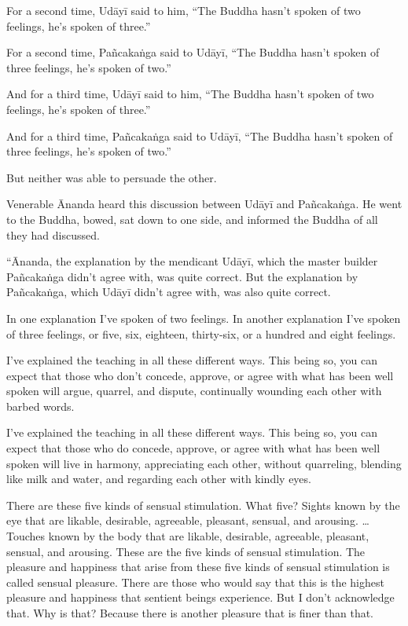 \documentclass[12pt,openany]{book}%
\begin{document}
For a second time, \textsanskrit{Udāyī} said to him, “The Buddha hasn’t spoken of two feelings, he’s spoken of three.” 

For a second time, \textsanskrit{Pañcakaṅga} said to \textsanskrit{Udāyī}, “The Buddha hasn’t spoken of three feelings, he’s spoken of two.” 

And for a third time, \textsanskrit{Udāyī} said to him, “The Buddha hasn’t spoken of two feelings, he’s spoken of three.” 

And for a third time, \textsanskrit{Pañcakaṅga} said to \textsanskrit{Udāyī}, “The Buddha hasn’t spoken of three feelings, he’s spoken of two.” 

But neither was able to persuade the other. 

Venerable Ānanda heard this discussion between \textsanskrit{Udāyī} and \textsanskrit{Pañcakaṅga}. He went to the Buddha, bowed, sat down to one side, and informed the Buddha of all they had discussed. 

“Ānanda, the explanation by the mendicant \textsanskrit{Udāyī}, which the master builder \textsanskrit{Pañcakaṅga} didn’t agree with, was quite correct. But the explanation by \textsanskrit{Pañcakaṅga}, which \textsanskrit{Udāyī} didn’t agree with, was also quite correct. 

In one explanation I’ve spoken of two feelings. In another explanation I’ve spoken of three feelings, or five, six, eighteen, thirty-six, or a hundred and eight feelings. 

I’ve explained the teaching in all these different ways. This being so, you can expect that those who don’t concede, approve, or agree with what has been well spoken will argue, quarrel, and dispute, continually wounding each other with barbed words. 

I’ve explained the teaching in all these different ways. This being so, you can expect that those who do concede, approve, or agree with what has been well spoken will live in harmony, appreciating each other, without quarreling, blending like milk and water, and regarding each other with kindly eyes. 

There are these five kinds of sensual stimulation. What five? Sights known by the eye that are likable, desirable, agreeable, pleasant, sensual, and arousing. … Touches known by the body that are likable, desirable, agreeable, pleasant, sensual, and arousing. These are the five kinds of sensual stimulation. The pleasure and happiness that arise from these five kinds of sensual stimulation is called sensual pleasure. There are those who would say that this is the highest pleasure and happiness that sentient beings experience. But I don’t acknowledge that. Why is that? Because there is another pleasure that is finer than that. 
\end{document}
